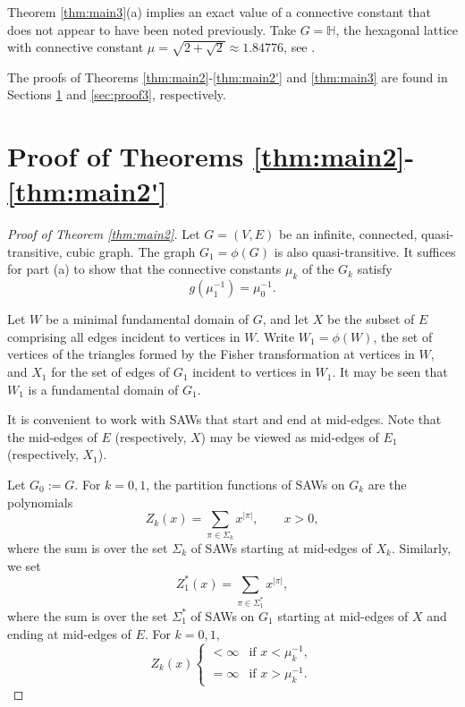 \documentclass[12pt]{amsart}
\theoremstyle{plain}
\numberwithin{equation}{section}
\numberwithin{theorem}{section}
\numberwithin{figure}{section}
\newcommand\oo{\infty}
\newcommand\HH{{\mathbb H}}
\newcommand\resp{respectively}
\begin{document}
Theorem \ref{thm:main3}(a) implies an exact value of a connective constant that does
not appear to have been noted previously. Take $G=\HH$, the hexagonal
lattice with connective constant $\mu= \sqrt{2+\sqrt 2} \approx 1.84776$,
see \cite{ds}. 


The proofs of Theorems \ref{thm:main2}-\ref{thm:main2'} and 
\ref{thm:main3} are found  in
Sections \ref{sec:main2} and \ref{sec:proof3}, \resp.


\section{Proof of Theorems \ref{thm:main2}-\ref{thm:main2'}}\label{sec:main2}

\begin{proof}[Proof of Theorem \ref{thm:main2}]

Let $G=(V,E)$ be an infinite, connected, quasi-transitive, cubic graph. 
The graph $G_1 = \phi(G)$ is also quasi-transitive. It suffices for part (a) to show that the connective constants $\mu_k$
of the $G_k$ satisfy 
\begin{equation}\label{10}
g(\mu_1^{-1}) = \mu_0^{-1}.
\end{equation}


Let $W$ be a minimal fundamental domain of $G$, and let 
$X$ be the subset of $E$ comprising all edges incident 
to vertices in $W$. Write $W_1=\phi(W)$, the set of vertices of the 
triangles formed by the Fisher transformation at vertices in $W$,
and $X_1$ for the set of edges of $G_1$ incident to vertices in $W_1$.
It may be seen that $W_1$ is a fundamental domain of $G_1$.

It is convenient to work with SAWs that start and end at mid-edges.
Note that the mid-edges 
of $E$ (\resp, $X$) may be viewed as  mid-edges of 
$E_1$ (\resp, $X_1$). 

Let $G_0:=G$. For $k=0,1$, the partition functions of SAWs on $G_k$ are the polynomials
\begin{equation*}
Z_k(x)=\sum_{\pi\in \Sigma_k} x^{|\pi|}, \qquad x >0,
\end{equation*}
where the sum is over the set $\Sigma_k$ of
SAWs starting at mid-edges of $X_k$. Similarly, we set
\begin{equation*}
Z_1^*(x) = \sum_{\pi \in \Sigma_1^*} x^{|\pi|},
\end{equation*}
where the sum is over the set $\Sigma_1^*$ of SAWs on 
$G_1$ starting at mid-edges of $X$ and ending at mid-edges of $E$.
For $k=0,1$,
\begin{equation}\label{225}
Z_k(x) 
\begin{cases} <\oo &\text{if } x < \mu_k^{-1},\\
=\oo &\text{if } x > \mu_k^{-1}.
\end{cases}
\end{equation}


\end{proof}
\end{document}
